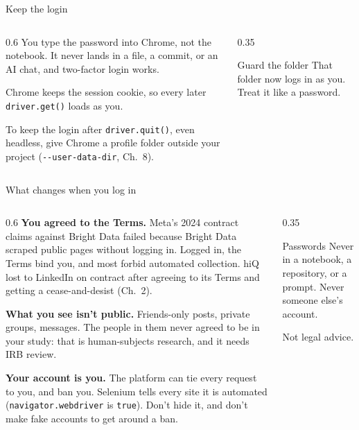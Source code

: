 \documentclass[9pt,aspectratio=169]{beamer}
\begin{document}
\begin{frame}{Keep the login}
    \begin{columns}[T]
        \begin{column}{0.6\textwidth}
            You type the password into Chrome, not the notebook. It never lands in a file, a commit, or an AI chat, and two-factor login works.

            \medskip
            Chrome keeps the session cookie, so every later \texttt{driver.get()} loads as you.

            \medskip
            To keep the login after \texttt{driver.quit()}, even headless, give Chrome a profile folder outside your project (\texttt{-{}-user-data-dir}, Ch.~8).
        \end{column}
        \begin{column}{0.35\textwidth}
            \begin{alertblock}{Guard the folder}
                \footnotesize That folder now logs in as you. Treat it like a password.
            \end{alertblock}
        \end{column}
    \end{columns}
\end{frame}

\begin{frame}{What changes when you log in}
    \begin{columns}[T]
        \begin{column}{0.6\textwidth}\small
            \textbf{You agreed to the Terms.} Meta's 2024 contract claims against Bright Data failed because Bright Data scraped public pages without logging in. Logged in, the Terms bind you, and most forbid automated collection. hiQ lost to LinkedIn on contract after agreeing to its Terms and getting a cease-and-desist (Ch.~2).

            \medskip
            \textbf{What you see isn't public.} Friends-only posts, private groups, messages. The people in them never agreed to be in your study: that is human-subjects research, and it needs IRB review.

            \medskip
            \textbf{Your account is you.} The platform can tie every request to you, and ban you. Selenium tells every site it is automated (\texttt{navigator.webdriver} is \texttt{true}). Don't hide it, and don't make fake accounts to get around a ban.
        \end{column}
        \begin{column}{0.35\textwidth}
            \begin{alertblock}{Passwords}
                \footnotesize Never in a notebook, a repository, or a prompt. Never someone else's account.
            \end{alertblock}

            \medskip
            {\scriptsize Not legal advice.}
        \end{column}
    \end{columns}
\end{frame}
\end{document}
